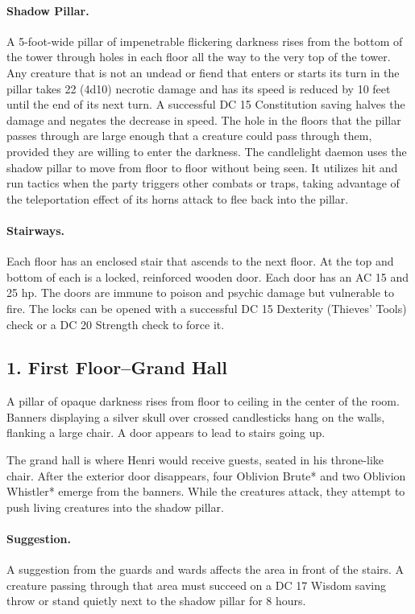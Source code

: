 \documentclass[10pt,a4paper,twoside,twocolumn,openany,bg=print,nodeprecatedcode]{dndbook}
\begin{document}
\paragraph{Shadow Pillar.}
A 5-foot-wide pillar of impenetrable flickering darkness rises from the bottom of the tower through holes in each floor all the way to the very top of the tower. Any creature that is not an undead or fiend that enters or starts its turn in the pillar takes 22 (4d10) necrotic damage and has its speed is reduced by 10 feet until the end of its next turn. A successful DC 15 Constitution saving halves the damage and negates the decrease in speed. The hole in the floors that the pillar passes through are large enough that a creature could pass through them, provided they are willing to enter the darkness. The candlelight daemon uses the shadow pillar to move from floor to floor without being seen. It utilizes hit and run tactics when the party triggers other combats or traps, taking advantage of the teleportation effect of its horns attack to flee back into the pillar.
\paragraph{Stairways.}
Each floor has an enclosed stair that ascends to the next floor. At the top and bottom of each is a locked, reinforced wooden door. Each door has an AC 15 and 25 hp. The doors are immune to poison and psychic damage but vulnerable to fire. The locks can be opened with a successful DC 15 Dexterity (Thieves' Tools) check or a DC 20 Strength check to force it.
\subsection{1. First Floor–Grand Hall}
\begin{DndReadAloud}{}
A pillar of opaque darkness rises from floor to ceiling in the center of the room. Banners displaying a silver skull over crossed candlesticks hang on the walls, flanking a large chair. A door appears to lead to stairs going up.
\end{DndReadAloud}

The grand hall is where Henri would receive guests, seated in his throne-like chair. After the exterior door disappears, four Oblivion Brute* and two Oblivion Whistler* emerge from the banners. While the creatures attack, they attempt to push living creatures into the shadow pillar.
\paragraph{Suggestion.}
A suggestion from the guards and wards affects the area in front of the stairs. A creature passing through that area must succeed on a DC 17 Wisdom saving throw or stand quietly next to the shadow pillar for 8 hours.
\end{document}
